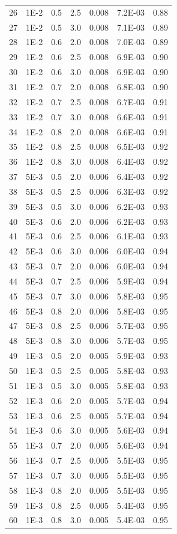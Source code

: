 {\begin{longtable}{ccccccc}
26&1E-2&0.5&2.5&0.008&7.2E-03&0.88\\
27&1E-2&0.5&3.0&0.008&7.1E-03&0.89\\
28&1E-2&0.6&2.0&0.008&7.0E-03&0.89\\
29&1E-2&0.6&2.5&0.008&6.9E-03&0.90\\
30&1E-2&0.6&3.0&0.008&6.9E-03&0.90\\
31&1E-2&0.7&2.0&0.008&6.8E-03&0.90\\
32&1E-2&0.7&2.5&0.008&6.7E-03&0.91\\
33&1E-2&0.7&3.0&0.008&6.6E-03&0.91\\
34&1E-2&0.8&2.0&0.008&6.6E-03&0.91\\
35&1E-2&0.8&2.5&0.008&6.5E-03&0.92\\
36&1E-2&0.8&3.0&0.008&6.4E-03&0.92\\
37&5E-3&0.5&2.0&0.006&6.4E-03&0.92\\
38&5E-3&0.5&2.5&0.006&6.3E-03&0.92\\
39&5E-3&0.5&3.0&0.006&6.2E-03&0.93\\
40&5E-3&0.6&2.0&0.006&6.2E-03&0.93\\
41&5E-3&0.6&2.5&0.006&6.1E-03&0.93\\
42&5E-3&0.6&3.0&0.006&6.0E-03&0.94\\
43&5E-3&0.7&2.0&0.006&6.0E-03&0.94\\
44&5E-3&0.7&2.5&0.006&5.9E-03&0.94\\
45&5E-3&0.7&3.0&0.006&5.8E-03&0.95\\
46&5E-3&0.8&2.0&0.006&5.8E-03&0.95\\
47&5E-3&0.8&2.5&0.006&5.7E-03&0.95\\
48&5E-3&0.8&3.0&0.006&5.7E-03&0.95\\
49&1E-3&0.5&2.0&0.005&5.9E-03&0.93\\
50&1E-3&0.5&2.5&0.005&5.8E-03&0.93\\
51&1E-3&0.5&3.0&0.005&5.8E-03&0.93\\
52&1E-3&0.6&2.0&0.005&5.7E-03&0.94\\
53&1E-3&0.6&2.5&0.005&5.7E-03&0.94\\
54&1E-3&0.6&3.0&0.005&5.6E-03&0.94\\
55&1E-3&0.7&2.0&0.005&5.6E-03&0.94\\
56&1E-3&0.7&2.5&0.005&5.5E-03&0.95\\
57&1E-3&0.7&3.0&0.005&5.5E-03&0.95\\
58&1E-3&0.8&2.0&0.005&5.5E-03&0.95\\
59&1E-3&0.8&2.5&0.005&5.4E-03&0.95\\
60&1E-3&0.8&3.0&0.005&5.4E-03&0.95\\
\end{longtable}
}
